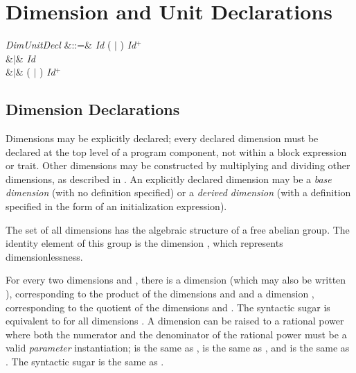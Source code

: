 %
%
%
%

\chapter{Dimension and Unit Declarations}


\begin{Grammar}
\emph{DimUnitDecl}
&::=&
 \emph{Id} 
( $|$ ) \emph{Id}$^+$
\\
&$|$&
 \emph{Id}
 \\
&$|$&
( $|$ )
\emph{Id}$^+$ 
 \\
\end{Grammar}

\section{Dimension Declarations}
Dimensions may be explicitly declared;
every declared dimension must be declared at the top level
of a program component,
not within a block expression or trait.
Other dimensions may be constructed by multiplying and dividing other dimensions,
as described in .
An explicitly declared dimension may be a \emph{base dimension} (with no definition specified)
or a \emph{derived dimension} (with a definition specified in the form of an initialization expression).

The set of all dimensions has the algebraic structure of a free abelian group.
The identity element of this group is the dimension , which represents dimensionlessness.

For every two dimensions  and , there is a
dimension  (which may also be written ),
corresponding to the product of the dimensions  and  and a
dimension , corresponding to the quotient of the
dimensions  and . The syntactic sugar  is equivalent
to  for all dimensions .
A dimension can be raised to a rational power where both
the numerator and the denominator of the rational power
must be a valid \emph{ parameter} instantiation;
 is the same as ,
 is the same as , and
 is the same as .
The syntactic sugar  is the same as .

